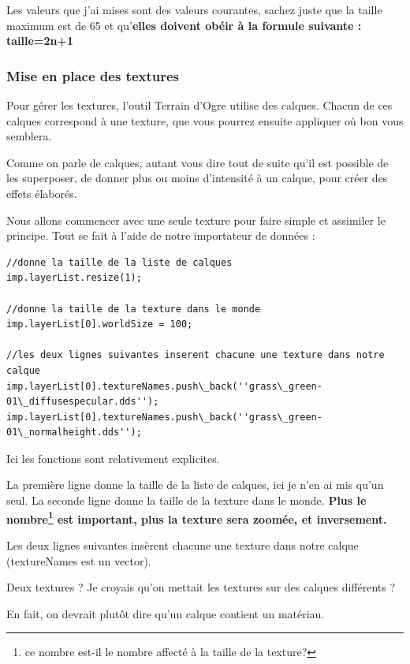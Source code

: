 Les valeurs que j'ai mises sont des valeurs courantes, sachez juste que la taille maximum est de 65 et qu'\textbf{elles doivent obéir à la formule suivante :
taille=2n+1}



\subsubsection{Mise en place des textures}

Pour gérer les textures, l'outil Terrain d'Ogre utilise des calques. Chacun de ces calques correspond à une texture, que vous pourrez ensuite appliquer o\`u bon vous semblera.

Comme on parle de calques, autant vous dire tout de suite qu'il est possible de les superposer, de donner plus ou moins d'intensité à un calque, pour créer des effets élaborés.

Nous allons commencer avec une seule texture pour faire simple et assimiler le principe. Tout se fait à l'aide de notre importateur de données :

\begin{lstlisting}[caption={Mise en place d'une texture pour le terrain}]
//donne la taille de la liste de calques
imp.layerList.resize(1);

//donne la taille de la texture dans le monde
imp.layerList[0].worldSize = 100;  

//les deux lignes suivantes inserent chacune une texture dans notre calque
imp.layerList[0].textureNames.push\_back(''grass\_green-01\_diffusespecular.dds'');
imp.layerList[0].textureNames.push\_back(''grass\_green-01\_normalheight.dds'');
\end{lstlisting}

Ici les fonctions sont relativement explicites.

La première ligne donne la taille de la liste de calques, ici je n'en ai mis qu'un seul. La seconde ligne donne la taille de la texture dans le monde. \textbf{Plus le nombre\footnote{ce nombre est-il le nombre affecté à la taille de la texture?} est important, plus la texture sera zoomée, et inversement.}

Les deux lignes suivantes insèrent chacune une texture dans notre calque (textureNames est un vector).

Deux textures ? Je croyais qu'on mettait les textures sur des calques différents ?

En fait, on devrait plutôt dire qu'un calque contient un matériau.

